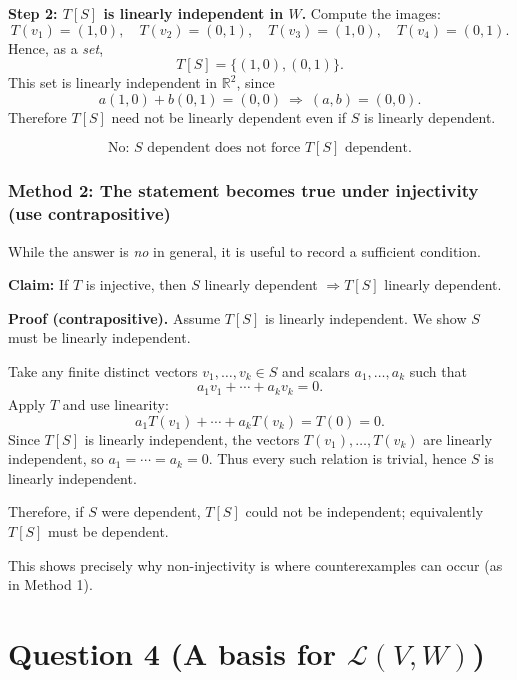 \documentclass[12pt]{article}
\newcommand{\R}{\mathbb{R}}
\newcommand{\cL}{\mathcal{L}}
\begin{document}
\medskip
\noindent\textbf{Step 2: $T[S]$ is linearly independent in $W$.}
Compute the images:
\[
T(v_1)=(1,0),\quad T(v_2)=(0,1),\quad T(v_3)=(1,0),\quad T(v_4)=(0,1).
\]
Hence, as a \emph{set},
\[
T[S]=\{(1,0),(0,1)\}.
\]
This set is linearly independent in $\R^2$, since
\[
a(1,0)+b(0,1)=(0,0)\ \Rightarrow\ (a,b)=(0,0).
\]
Therefore $T[S]$ need not be linearly dependent even if $S$ is linearly dependent.

\[
\boxed{\,\text{No: }S\text{ dependent does not force }T[S]\text{ dependent.}\,}
\]

\subsubsection{Method 2: The statement becomes true under injectivity (use contrapositive)}
While the answer is \emph{no} in general, it is useful to record a sufficient condition.

\medskip
\noindent\textbf{Claim:} If $T$ is injective, then $S$ linearly dependent $\Rightarrow T[S]$ linearly dependent.

\medskip
\noindent\textbf{Proof (contrapositive).}
Assume $T[S]$ is linearly independent. We show $S$ must be linearly independent.

Take any finite distinct vectors $v_1,\dots,v_k\in S$ and scalars $a_1,\dots,a_k$ such that
\[
a_1 v_1+\cdots+a_k v_k=0.
\]
Apply $T$ and use linearity:
\[
a_1 T(v_1)+\cdots+a_k T(v_k)=T(0)=0.
\]
Since $T[S]$ is linearly independent, the vectors $T(v_1),\dots,T(v_k)$ are linearly independent,
so $a_1=\cdots=a_k=0$. Thus every such relation is trivial, hence $S$ is linearly independent.

Therefore, if $S$ were dependent, $T[S]$ could not be independent; equivalently $T[S]$ must be dependent.

\medskip
\noindent This shows precisely why non-injectivity is where counterexamples can occur (as in Method 1).

\newpage
\section{Question 4 (A basis for $\cL(V,W)$)}
\end{document}
